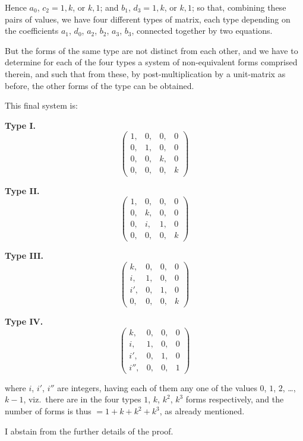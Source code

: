 \documentclass[11pt,a4paper]{article}
\theoremstyle{definition}
\begin{document}
Hence $a_0$, $c_2 = 1, k$, or $k, 1$; and $b_1$, $d_3 = 1, k$, or $k, 1$; so that, combining these pairs of values, we have four different types of matrix, each type depending on the coefficients $a_1$, $d_0$, $a_2$, $b_2$, $a_3$, $b_3$, connected together by two equations.

But the forms of the same type are not distinct from each other, and we have to determine for each of the four types a system of non-equivalent forms comprised therein, and such that from these, by post-multiplication by a unit-matrix as before, the other forms of the type can be obtained.

This final system is:

\medskip

\textbf{Type I.}
\[
\begin{pmatrix}
1, & 0, & 0, & 0\\
0, & 1, & 0, & 0\\
0, & 0, & k, & 0\\
0, & 0, & 0, & k
\end{pmatrix}
\]

\textbf{Type II.}
\[
\begin{pmatrix}
1, & 0, & 0, & 0\\
0, & k, & 0, & 0\\
0, & i, & 1, & 0\\
0, & 0, & 0, & k
\end{pmatrix}
\]

\textbf{Type III.}
\[
\begin{pmatrix}
k, & 0, & 0, & 0\\
i, & 1, & 0, & 0\\
i', & 0, & 1, & 0\\
0, & 0, & 0, & k
\end{pmatrix}
\]

\textbf{Type IV.}
\[
\begin{pmatrix}
k, & 0, & 0, & 0\\
i, & 1, & 0, & 0\\
i', & 0, & 1, & 0\\
i'', & 0, & 0, & 1
\end{pmatrix}
\]

\medskip

where $i$, $i'$, $i''$ are integers, having each of them any one of the values $0$, $1$, $2$, \ldots, $k-1$, viz.\ there are in the four types $1$, $k$, $k^2$, $k^3$ forms respectively, and the number of forms is thus $= 1 + k + k^2 + k^3$, as already mentioned.

I abstain from the further details of the proof.
\end{document}
